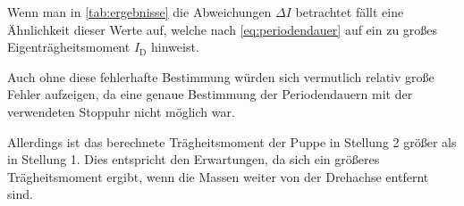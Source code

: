 Wenn man in \autoref{tab:ergebnisse} die Abweichungen $\Delta I$ betrachtet fällt eine Ähnlichkeit dieser Werte auf, welche nach \autoref{eq:periodendauer} auf ein zu großes Eigenträgheitsmoment $I_\text{D}$ hinweist. 

Auch ohne diese fehlerhafte Bestimmung würden sich vermutlich relativ große Fehler aufzeigen, da eine genaue Bestimmung der Periodendauern mit der verwendeten Stoppuhr nicht möglich war.

Allerdings ist das berechnete Trägheitsmoment der Puppe in Stellung 2 größer als in Stellung 1.
Dies entspricht den Erwartungen, da sich ein größeres Trägheitsmoment ergibt, wenn die Massen weiter von der Drehachse entfernt sind.

